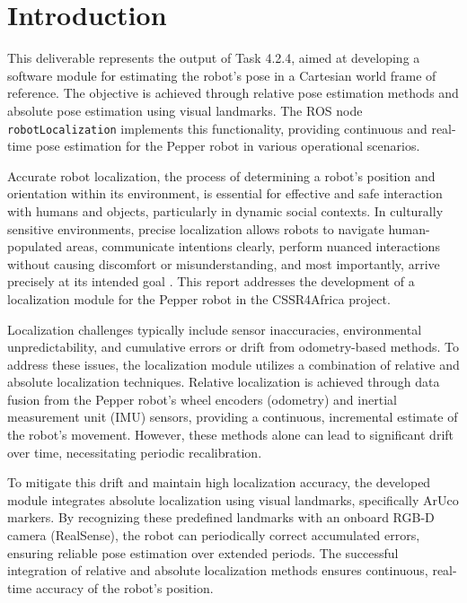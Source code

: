 \documentclass{CSSRforAfrica}
\begin{document}
\newpage
\pagebreak
\tableofcontents
\newpage

\section{Introduction}
This deliverable represents the output of Task 4.2.4, aimed at developing a software module for estimating the robot’s pose in a Cartesian world frame of reference. The objective is achieved through relative pose estimation methods and absolute pose estimation using visual landmarks. The ROS node \texttt{robotLocalization} implements this functionality, providing continuous and real-time pose estimation for the Pepper robot in various operational scenarios.

Accurate robot localization, the process of determining a robot's position and orientation within its environment, is essential for effective and safe interaction with humans and objects, particularly in dynamic social contexts. In culturally sensitive environments, precise localization allows robots to navigate human-populated areas, communicate intentions clearly, perform nuanced interactions without causing discomfort or misunderstanding, and most importantly, arrive precisely at its intended goal \cite{trovato}. This report addresses the development of a localization module for the Pepper robot in the CSSR4Africa project.

Localization challenges typically include sensor inaccuracies, environmental unpredictability, and cumulative errors or drift from odometry-based methods. To address these issues, the localization module utilizes a combination of relative and absolute localization techniques. Relative localization is achieved through data fusion from the Pepper robot’s wheel encoders (odometry) and inertial measurement unit (IMU) sensors, providing a continuous, incremental estimate of the robot's movement. However, these methods alone can lead to significant drift over time, necessitating periodic recalibration.

To mitigate this drift and maintain high localization accuracy, the developed module integrates absolute localization using visual landmarks, specifically ArUco markers. By recognizing these predefined landmarks with an onboard RGB-D camera (RealSense), the robot can periodically correct accumulated errors, ensuring reliable pose estimation over extended periods. The successful integration of relative and absolute localization methods ensures continuous, real-time accuracy of the robot's position.
\end{document}
